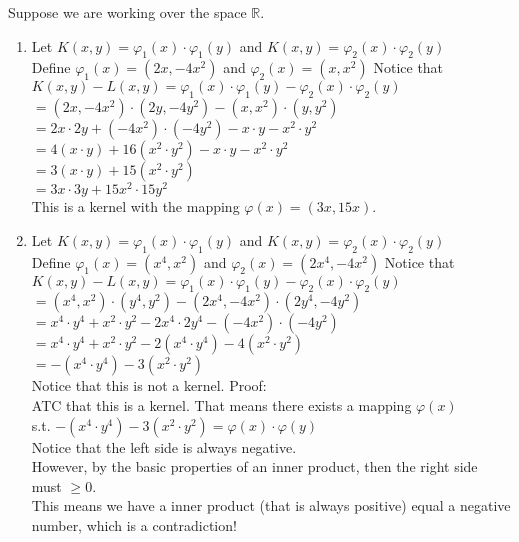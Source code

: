 \documentclass[12pt]{article}
\begin{document}
Suppose we are working over the space $\mathbb{R}$.
		\begin{enumerate}
			\item Let $K(x,y) = \varphi_1(x)\cdot\varphi_1(y)$ and $K(x,y) = \varphi_2(x)\cdot\varphi_2(y)$ \\
			Define $\varphi_1(x) = (2x, -4x^2)$ and $\varphi_2(x) = (x, x^2) $
			Notice that $ K(x,y) - L(x,y) = \varphi_1(x)\cdot\varphi_1(y) - \varphi_2(x)\cdot\varphi_2(y) $ \\
			$ = (2x, -4x^2)\cdot(2y, -4y^2) - (x, x^2)\cdot(y,y^2) $ \\
			$ = 2x \cdot 2y + (-4x^2) \cdot (-4y^2) - x \cdot y - x^2 \cdot y^2 $ \\
			$ = 4(x \cdot y) + 16(x^2 \cdot y^2) - x \cdot y - x^2 \cdot y^2 $ \\
			$ = 3(x \cdot y) + 15(x^2 \cdot y^2) $ \\
			$ = 3x \cdot 3y + 15x^2 \cdot 15y^2 $ \\
			This is a kernel with the mapping $ \varphi(x) = (3x, 15x) $.
			\item Let $K(x,y) = \varphi_1(x)\cdot\varphi_1(y)$ and $K(x,y) = \varphi_2(x)\cdot\varphi_2(y)$ \\
			Define $\varphi_1(x) = (x^4, x^2)$ and $\varphi_2(x) = (2x^4, -4x^2) $
			Notice that $ K(x,y) - L(x,y) = \varphi_1(x)\cdot\varphi_1(y) - \varphi_2(x)\cdot\varphi_2(y) $ \\
			$ = (x^4, x^2)\cdot(y^4,y^2) - (2x^4, -4x^2)\cdot(2y^4, -4y^2) $ \\
			$ = x^4 \cdot y^4 + x^2 \cdot y^2 - 2x^4 \cdot 2y^4 - (-4x^2) \cdot (-4y^2) $ \\
			$ = x^4 \cdot y^4 + x^2 \cdot y^2 - 2(x^4 \cdot y^4) - 4(x^2 \cdot y^2) $ \\
			$ = -(x^4 \cdot y^4) - 3(x^2 \cdot y^2) $ \\
			Notice that this is not a kernel. Proof: \\
			ATC that this is a kernel. That means there exists a mapping $\varphi(x)$ \\
			s.t. $ -(x^4 \cdot y^4) - 3(x^2 \cdot y^2) = \varphi(x) \cdot \varphi(y) $ \\
			Notice that the left side is always negative. \\
			However, by the basic properties of an inner product, then the right side must  $ \geq 0 $. \\
			This means we have a inner product (that is always positive) equal a negative number, which is a contradiction!
		\end{enumerate}
\end{document}
